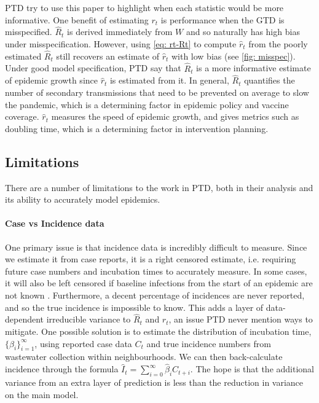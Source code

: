 \documentclass[12pt]{article}
\begin{document}
      PTD try to use this paper to highlight when each statistic would be more informative.
      One benefit of estimating $r_t$ is performance when the GTD 
      is misspecified. $\hat{R}_t$ is derived immediately from $W$ and so naturally has high bias under misspecification. 
      However, using \cref{eq: rt-Rt} to compute $\hat{r}_t$ from the poorly estimated $\hat{R}_t$ 
      still recovers an estimate of $\hat{r}_t$ with low bias (see \cref{fig: misspec}). Under good model specification, 
      PTD say that $\hat{R}_t$ is a more informative estimate of epidemic growth 
      since $\hat{r}_t$ is estimated from it. In general, $\hat{R}_t$ quantifies the number of
      secondary transmissions that need to be prevented on average to slow the pandemic, which is a determining factor in 
      epidemic policy and vaccine coverage. $\hat{r}_t$ measures the speed of epidemic growth, 
      and gives metrics such as doubling time, which is a determining factor in intervention planning. 

    \subsection{Limitations}
      There are a number of limitations to the work in PTD, both in their analysis
      and its ability to accurately model epidemics. 

      \paragraph{Case vs Incidence data} One primary issue is that 
      incidence data is incredibly difficult to measure. Since we estimate it from case reports, it is a right censored estimate, 
      i.e. requiring future case numbers and incubation times to accurately measure. 
      In some cases, it will also be left censored if baseline infections
      from the start of an epidemic are not known \citep{Fraser2007}. 
      Furthermore, a decent percentage of incidences are never reported,
      and so the true incidence is impossible to know. This adds a layer of data-dependent irreducible variance to 
      $\hat{R}_t$ and $\hat{r}_t$, an issue PTD never mention ways to mitigate. 
      One possible solution \citep{Comiskey2021} is to estimate the distribution of incubation time, 
      $\{\beta_i\}_{i=1}^\infty$, using reported case data $C_t$ and true incidence numbers from wastewater collection within neighbourhoods. 
      We can then back-calculate incidence through the formula $\hat{I}_t = \sum_{i=0}^\infty \hat{\beta}_i C_{t+i}$. 
      The hope is that the additional variance from an extra layer of prediction is less than the reduction in variance on the main
      model. 
      
\end{document}
